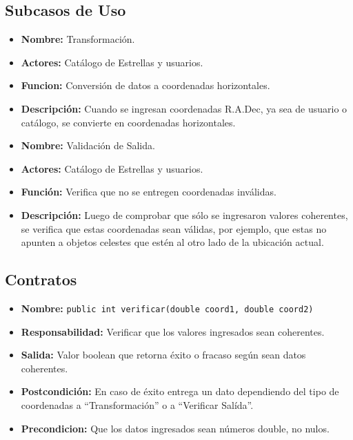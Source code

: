 \documentclass[letterpaper,spanish,10pt]{article}
\begin{document}
\subsection{Subcasos de Uso}

\begin{itemize}
\item \textbf{Nombre:} Transformaci\'on.
\item \textbf{Actores:} Cat\'alogo de Estrellas y usuarios.
\item \textbf{Funcion:} Conversi\'on de datos a coordenadas horizontales.
\item \textbf{Descripci\'on:} Cuando se ingresan coordenadas R.A.Dec, ya sea de usuario o cat\'alogo, se convierte en coordenadas horizontales.
\end{itemize}

\begin{itemize}
\item \textbf{Nombre:} Validaci\'on de Salida.
\item \textbf{Actores:} Cat\'alogo de Estrellas y usuarios.
\item \textbf{Funci\'on:} Verifica que no se entregen coordenadas inv\'alidas.
\item \textbf{Descripci\'on:} Luego de comprobar que s\'olo se ingresaron valores coherentes, se verifica que estas coordenadas sean v\'alidas, por ejemplo, que estas no apunten a objetos celestes que est\'en al otro lado de la ubicaci\'on actual.
\end{itemize}


\subsection{Contratos}

\begin{itemize}
\item \textbf{Nombre:} \texttt{public int verificar(double coord1, double coord2)}
\item \textbf{Responsabilidad:} Verificar que los valores ingresados sean coherentes.
\item \textbf{Salida:} Valor boolean que retorna \'exito o fracaso seg\'un sean datos coherentes.
\item \textbf{Postcondici\'on:} En caso de \'exito entrega un dato dependiendo del tipo de coordenadas a ``Transformaci\'on'' o a ``Verificar Sal\'ida''.
\item \textbf{Precondicion:} Que los datos ingresados sean n\'umeros double, no nulos.
\end{itemize}
\end{document}
